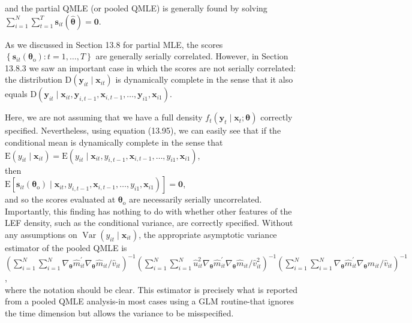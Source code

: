 \documentclass[10pt]{article}
\begin{document}
and the partial QMLE (or pooled QMLE) is generally found by solving $\sum_{i=1}^{N} \sum_{t=1}^{T} \mathbf{s}_{i t}(\hat{\boldsymbol{\theta}})=\mathbf{0}$.

As we discussed in Section 13.8 for partial MLE, the scores $\left\{\mathbf{s}_{i t}\left(\boldsymbol{\theta}_{\mathrm{o}}\right): t=1, \ldots, T\right\}$ are generally serially correlated. However, in Section 13.8.3 we saw an important case in which the scores are not serially correlated: the distribution $\mathrm{D}\left(\mathbf{y}_{i t} \mid \mathbf{x}_{i t}\right)$ is dynamically complete in the sense that it also equals $\mathrm{D}\left(\mathbf{y}_{i t} \mid \mathbf{x}_{i t}, \mathbf{y}_{i, t-1}, \mathbf{x}_{i, t-1}, \ldots, \mathbf{y}_{i 1}, \mathbf{x}_{i 1}\right)$.

Here, we are not assuming that we have a full density $f_{t}\left(\mathbf{y}_{t} \mid \mathbf{x}_{t} ; \boldsymbol{\theta}\right)$ correctly specified. Nevertheless, using equation (13.95), we can easily see that if the conditional mean is dynamically complete in the sense that\\
$\mathrm{E}\left(y_{i t} \mid \mathbf{x}_{i t}\right)=\mathrm{E}\left(y_{i t} \mid \mathbf{x}_{i t}, y_{i, t-1}, \mathbf{x}_{i, t-1}, \ldots, y_{i 1}, \mathbf{x}_{i 1}\right)$,\\
then\\
$\left.\mathrm{E}\left[\mathbf{s}_{i t}\left(\boldsymbol{\theta}_{\mathrm{o}}\right) \mid \mathbf{x}_{i t}, y_{i, t-1}, \mathbf{x}_{i, t-1}, \ldots, y_{i 1}, \mathbf{x}_{i 1}\right)\right]=\mathbf{0}$,\\
and so the scores evaluated at $\boldsymbol{\theta}_{\mathrm{o}}$ are necessarily serially uncorrelated. Importantly, this finding has nothing to do with whether other features of the LEF density, such as the conditional variance, are correctly specified. Without any assumptions on $\operatorname{Var}\left(y_{i t} \mid \mathbf{x}_{i t}\right)$, the appropriate asymptotic variance estimator of the pooled QMLE is\\
$\left(\sum_{i=1}^{N} \sum_{i=1}^{N} \nabla_{\boldsymbol{\theta}} \hat{m}_{i t}^{\prime} \nabla_{\boldsymbol{\theta}} \hat{m}_{i t} / \hat{v}_{i t}\right)^{-1}\left(\sum_{i=1}^{N} \sum_{i=1}^{N} \hat{u}_{i t}^{2} \nabla_{\boldsymbol{\theta}} \hat{m}_{i t}^{\prime} \nabla_{\boldsymbol{\theta}} \hat{m}_{i t} / \hat{v}_{i t}^{2}\right)^{-1}\left(\sum_{i=1}^{N} \sum_{i=1}^{N} \nabla_{\boldsymbol{\theta}} \hat{m}_{i t}^{\prime} \nabla_{\boldsymbol{\theta}} \hat{m}_{i t} / \hat{v}_{i t}\right)^{-1}$,\\
where the notation should be clear. This estimator is precisely what is reported from a pooled QMLE analysis-in most cases using a GLM routine-that ignores the time dimension but allows the variance to be misspecified.
\end{document}
